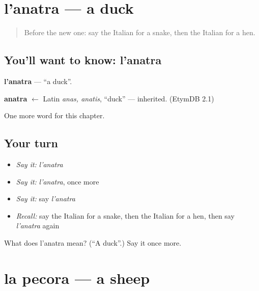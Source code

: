 \section[l'anatra]{l'anatra — a duck}

\label{lesson:IT-C70-anatra}



\begin{quote}
Before the new one: say the Italian for a snake, then the Italian for a hen.
\end{quote}

\subsection*{You'll want to know: l'anatra}
\textbf{l'anatra} — \textquotedblleft{}a duck\textquotedblright{}.

\begin{cousinweb}
\textbf{anatra} $\leftarrow$ Latin \emph{anas, anatis}, \textquotedblleft{}duck\textquotedblright{} — inherited. (EtymDB 2.1)
\end{cousinweb}

\begin{grammarlens}[title={What you've built}]
One more word for this chapter.
\end{grammarlens}

\subsection*{Your turn}
\begin{itemize}
\raggedright
  \item \emph{Say it:} \emph{l'anatra}
  \item \emph{Say it:} \emph{l'anatra}, once more
  \item \emph{Say it:} say \emph{l'anatra}
  \item \emph{Recall:} say the Italian for a snake, then the Italian for a hen, then say \emph{l'anatra} again
\end{itemize}

\begin{tcolorbox}[breakable,colback=teal!4,colframe=teal!35!black,title={Before you move on}]
What does l'anatra mean? (\textquotedblleft{}A duck\textquotedblright{}.) Say it once more.
\end{tcolorbox}
\section[la pecora]{la pecora — a sheep}

